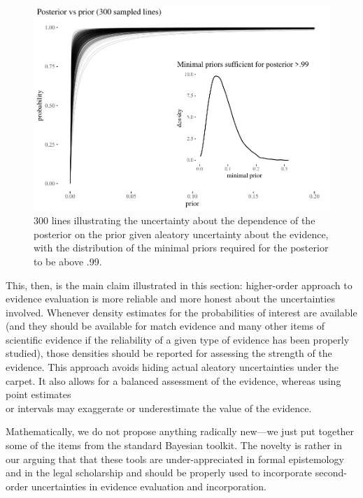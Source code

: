\documentclass[
  10pt,
  dvipsnames,enabledeprecatedfontcommands]{scrartcl}
\begin{document}

\begin{figure}[H]

\begin{center}\includegraphics[width=0.6\linewidth]{imprecision_philosophical_paper2_files/figure-latex/Figlines5-1} \end{center}

\caption{300 lines illustrating the uncertainty about the dependence of the posterior on the prior given aleatory uncertainty about the evidence, with the distribution of the minimal priors required for the posterior to be above .99.}

\label{Figlines}

\end{figure}

This, then, is the main claim illustrated in this section: higher-order
approach to evidence evaluation is more reliable and more honest about
the uncertainties involved. Whenever density estimates for the
probabilities of interest are available (and they should be available
for match evidence and many other items of scientific evidence if the
reliability of a given type of evidence has been properly studied),
those densities should be reported for assessing the strength of the
evidence. This approach avoids hiding actual aleatory uncertainties
under the carpet. It also allows for a balanced assessment of the
evidence, whereas using point estimates\\
or intervals may exaggerate or underestimate the value of the evidence.

Mathematically, we do not propose anything radically new---we just put
together some of the items from the standard Bayesian toolkit. The
novelty is rather in our arguing that that these tools are
under-appreciated in formal epistemology and in the legal scholarship
and should be properly used to incorporate second-order uncertainties in
evidence evaluation and incorporation.
\end{document}
